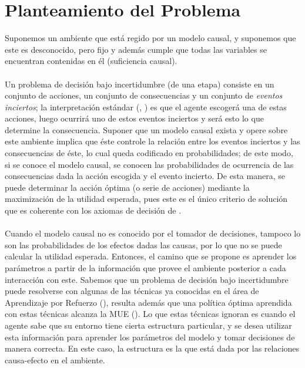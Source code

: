 \documentclass[11pt]{article}
\theoremstyle{plain}
\begin{document}
\section{Planteamiento del Problema}
Suponemos un ambiente que está regido por un modelo causal, y suponemos que este es desconocido, pero fijo y además cumple que todas las variables se encuentran contenidas en él (suficiencia causal).\\
\\
\indent Un problema de decisión bajo incertidumbre (de una etapa) consiste en un conjunto de acciones, un conjunto de consecuencias y un conjunto de \textit{eventos inciertos}; la interpretación estándar (\cite{bernardo2000bayesian}, \cite{gilboa2009decision}) es que el agente escogerá una de estas acciones, luego ocurrirá uno de estos eventos inciertos y será esto lo que determine la consecuencia. Suponer que un modelo causal exista y opere sobre este ambiente implica que éste controle la relación entre los eventos inciertos y las consecuencias de éste, lo cual queda codificado en probabilidades; de este modo, si se conoce el modelo causal, se conocen las probabilidades de ocurrencia de las consecuencias dada la acción escogida y el evento incierto. De esta manera, se puede determinar la acción óptima (o serie de acciones) mediante la maximización de la utilidad esperada, pues este es el único criterio de solución que es coherente con los axiomas de decisión de \cite{savage1954the}.\\
\\
\indent Cuando el modelo causal no es conocido por el tomador de decisiones, tampoco lo son las probabilidades de los efectos dadas las causas, por lo que no se puede calcular la utilidad esperada. Entonces, el camino que se propone es aprender los parámetros a partir de la información que provee el ambiente posterior a cada interacción con este. Sabemos que un problema de decisión bajo incertidumbre puede resolverse con algunas de las técnicas ya conocidas en el área de Aprendizaje por Refuerzo (\cite{sutton1998reinforcement}), resulta además que una política óptima aprendida con estas técnicas alcanza la MUE (\cite{webb2007game}). Lo que estas técnicas ignoran es cuando el agente sabe que su entorno tiene cierta estructura particular, y se desea utilizar esta información para aprender los parámetros del modelo y tomar decisiones de manera correcta. En este caso, la estructura es la que está dada por las relaciones causa-efecto en el ambiente.\\
\\
\end{document}
